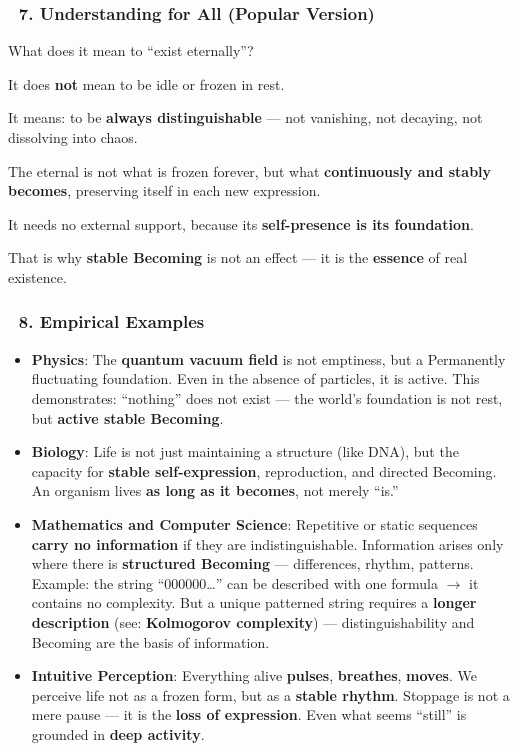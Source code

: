 \documentclass[12pt]{article}
\begin{document}
\subsubsection*{🔹 7. Understanding for All (Popular Version)}
What does it mean to ``exist eternally''?

It does \textbf{not} mean to be idle or frozen in rest.

It means: to be \textbf{always distinguishable} — not vanishing, not decaying, not dissolving into chaos.

\bigskip
The eternal is not what is frozen forever, but what \textbf{continuously and stably becomes}, preserving itself in each new expression.

It needs no external support, because its \textbf{self-presence is its foundation}.

That is why \textbf{stable Becoming} is not an effect — it is the \textbf{essence} of real existence.

\subsubsection*{🔹 8. Empirical Examples}
\begin{itemize}
\item \textbf{Physics}: The \textbf{quantum vacuum field} is not emptiness, but a Permanently fluctuating foundation. Even in the absence of particles, it is active. This demonstrates: ``nothing'' does not exist — the world's foundation is not rest, but \textbf{active stable Becoming}.
\item \textbf{Biology}: Life is not just maintaining a structure (like DNA), but the capacity for \textbf{stable self-expression}, reproduction, and directed Becoming. An organism lives \textbf{as long as it becomes}, not merely ``is.''
\item \textbf{Mathematics and Computer Science}: Repetitive or static sequences \textbf{carry no information} if they are indistinguishable. Information arises only where there is \textbf{structured Becoming} — differences, rhythm, patterns. Example: the string ``000000…'' can be described with one formula $\rightarrow$ it contains no complexity. But a unique patterned string requires a \textbf{longer description} (see: \textbf{Kolmogorov complexity}) — distinguishability and Becoming are the basis of information.
\item \textbf{Intuitive Perception}: Everything alive \textbf{pulses}, \textbf{breathes}, \textbf{moves}. We perceive life not as a frozen form, but as a \textbf{stable rhythm}. Stoppage is not a mere pause — it is the \textbf{loss of expression}. Even what seems ``still'' is grounded in \textbf{deep activity}.
\end{itemize}
\end{document}
